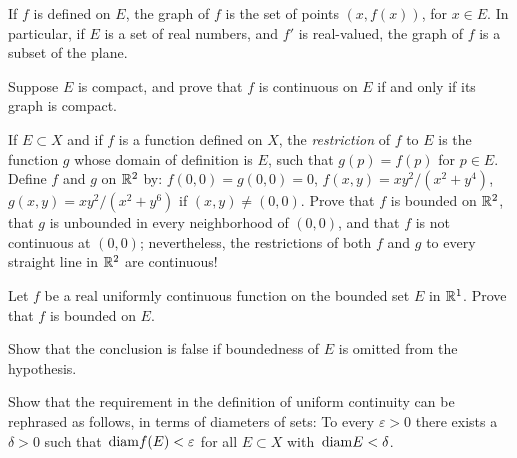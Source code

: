 \begin{myExercise}
    \label{ex:4.6}
    If $f$ is defined on $E$, the graph of $f$ is the set of points $(x, f(x))$, for $x \in E$. 
    In particular, if $E$ is a set of real numbers, and $f'$ is real-valued, the graph of $f$ is a subset of the plane.
    
    Suppose $E$ is compact, and prove that $f$ is continuous on $E$ if and only if its graph is compact.
\end{myExercise}


\begin{myExercise}
    \label{ex:4.7}
    If $E \subset X$ and if $f$ is a function defined on $X$, 
    the \emph{restriction} of $f$ to $E$ is the function $g$ whose domain of definition is $E$, such that $g(p) =f(p)$ for $p \in E$. 
    Define $f$ and $g$ on ${\protect\mathbb R}^2$ by: 
    $f(0, 0) = g(0, 0) = 0$, 
    $f(x, y) = xy^2 /(x^2 + y^4)$, 
    $g(x, y) = xy^2 /(x^2 + y^6)$ 
    if $(x, y) \neq  (0, 0)$. 
    Prove that $f$ is bounded on ${\protect\mathbb R}^2$, 
    that $g$ is unbounded in every neighborhood of $(0, 0)$, 
    and that $f$ is not continuous at $(0, 0)$; 
    nevertheless, the restrictions of both $f$ and $g$ to every straight line in ${\protect\mathbb R}^2$ are continuous!
\end{myExercise}


\begin{myExercise}
    \label{ex:4.8}
    Let $f$ be a real uniformly continuous function on the bounded set $E$ in ${\protect\mathbb R}^1$. 
    Prove that $f$ is bounded on $E$. 

    Show that the conclusion is false if boundedness of $E$ is omitted from the hypothesis.
\end{myExercise}


\begin{myExercise}
    \label{ex:4.9}
    Show that the requirement in the definition of uniform continuity can be rephrased as follows, in terms of diameters of sets: 
    To every $\varepsilon > 0$ there exists a $\delta > 0$ 
    such that $\protect\mathop{}\mathrm{diam} f(E) < \varepsilon$ for all $E \subset X$ with $\protect\mathop{}\mathrm{diam} E < \delta$.
\end{myExercise}